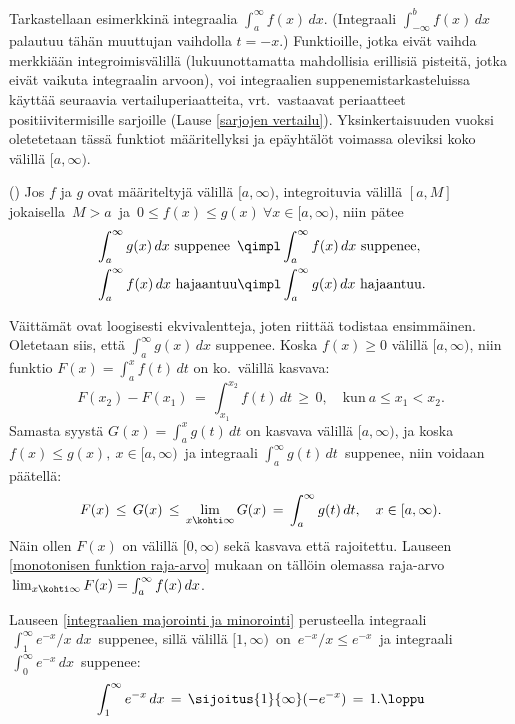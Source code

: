 Tarkastellaan esimerkkinä integraalia $\int_a^\infty f(x)\,dx$.
(Integraali $\int_{-\infty}^b f(x)\,dx$ palautuu tähän muuttujan vaihdolla $t=-x$.)
Funktioille, jotka
eivät vaihda merkkiään integroimisvälillä (lukuunottamatta mahdollisia erillisiä pisteitä,
jotka eivät vaikuta integraalin arvoon), voi integraalien suppenemistarkasteluissa käyttää
seuraavia vertailuperiaatteita, vrt.\ vastaavat periaatteet positiivitermisille sarjoille
(Lause \ref{sarjojen vertailu}). Yksinkertaisuuden vuoksi oletetetaan tässä funktiot
määritellyksi ja epäyhtälöt voimassa oleviksi koko välillä $[a,\infty)$. 
\begin{Lause} \label{integraalien majorointi ja minorointi}
()\newline
Jos $f$ ja $g$ ovat määriteltyjä välillä $[a,\infty)$, integroituvia välillä $[a,M]$ jokaisella
$\,M>a\,$ ja $\,0 \le f(x) \le g(x)\ \forall x\in[a,\infty)$, niin pätee
\begin{align*}
&\int_a^\infty g(x)\,dx\ \text{suppenee} \,\ \qimpl \int_a^\infty f(x)\,dx\ \text{suppenee}, \\
&\int_a^\infty f(x)\,dx\ \text{hajaantuu} \qimpl \int_a^\infty g(x)\,dx\ \text{hajaantuu}.
\end{align*}
\end{Lause}
\tod Väittämät ovat loogisesti ekvivalentteja, joten riittää todistaa ensimmäinen.
Oletetaan siis, että $\int_a^\infty g(x)\,dx$ suppenee. Koska $f(x) \ge 0$ välillä
$[a,\infty)$, niin funktio $F(x)=\int_a^x f(t)\,dt$ on ko.\ välillä kasvava:
\[
F(x_2)-F(x_1) \,=\, \int_{x_1}^{x_2} f(t)\,dt \,\ge\, 0, \quad \text{kun}\ a \le x_1 < x_2.
\]
Samasta syystä $G(x)=\int_a^x g(t)\,dt$ on kasvava välillä $[a,\infty)$, ja koska
$f(x) \le g(x),\ x\in[a,\infty)\,$ ja integraali $\int_a^\infty g(t)\,dt\,$ suppenee, niin
voidaan päätellä:
\[
F(x)\,\le\,G(x)\,\le\,\lim_{x\kohti\infty}G(x)\,=\,\int_a^\infty g(t)\,dt, \quad x\in[a,\infty).
\]
Näin ollen $F(x)$ on välillä $[0,\infty)$ sekä kasvava että rajoitettu. Lauseen
\ref{monotonisen funktion raja-arvo} mukaan on tällöin olemassa raja-arvo
$\,\lim_{x\kohti\infty}F(x)=\int_a^\infty f(x)\,dx$. \loppu
\begin{Exa} Lauseen \ref{integraalien majorointi ja minorointi} perusteella integraali
$\,\int_1^\infty e^{-x}/x\,\,dx\,$ suppenee, sillä välillä $[1,\infty)\,$ on
$\,e^{-x}/x \le e^{-x}\,$ ja integraali $\,\int_0^\infty e^{-x}\,dx\,$ suppenee:
\[
\int_1^\infty e^{-x}\,dx\,=\,\sijoitus{1}{\infty} (-e^{-x})\,=\,1. \loppu
\]
\end{Exa}
